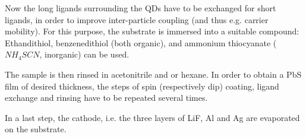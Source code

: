 Now the long ligands surrounding the QDs have to be exchanged for short ligands, in order to improve inter-particle coupling (and thus e.g. carrier mobility). For this purpose, the substrate is immersed into a suitable compound: Ethandithiol, benzenedithiol (both organic), and ammonium thiocyanate ($NH_4SCN$, inorganic) can be used.

The sample is then rinsed in acetonitrile and or hexane. In order to obtain a PbS film of desired thickness, the steps of spin (respectively dip) coating, ligand exchange and rinsing have to be repeated several times.

In a last step, the cathode, i.e. the three layers of LiF, Al and Ag are evaporated on the substrate.
	